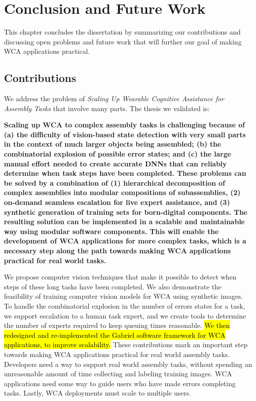 \chapter{Conclusion and Future Work}\label{chap:conclusion}

This chapter concludes the dissertation by summarizing our contributions and
discussing open problems and future work that will further our goal of making
WCA applications practical.

\section{Contributions}

We address the problem of \textit{Scaling Up Wearable Cognitive Assistance for
  Assembly Tasks} that involve many parts.
The thesis we validated is:

\textbf{
  Scaling up WCA to complex assembly tasks is challenging because of
  (a) the difficulty of
  vision-based state detection with very small parts in the context of much
  larger objects being assembled; (b) the combinatorial explosion
  of possible error states; and (c) the large manual effort needed to create
  accurate DNNs that can reliably determine when task steps have been completed.
  These problems can be solved by a combination of (1) hierarchical
  decomposition of
  complex assemblies into modular compositions of subassemblies, (2) on-demand
  seamless
  escalation for live expert assistance, and (3) synthetic generation of
  training
  sets for born-digital components. The resulting solution can be implemented in
  a scalable and maintainable way using modular software components.
  This will enable the development of WCA applications for more complex tasks,
  which is a necessary step along the path towards making WCA applications
  practical for real world tasks.
}

We propose computer vision techniques that make it possible to detect when steps
of these long tasks have been completed.
We also demonstrate the feasibility of training computer vision models for WCA
using synthetic images.
To handle the combinatorial explosion in the number of errors states for a task,
we support escalation to a human task expert, and we create tools to determine
the number of experts required to keep queuing times reasonable.
\hl{
  We then redesigned and re-implemented the Gabriel software framework for WCA
  applications, to improve scalability.
}
These contributions mark an important step towards making WCA applications
practical for real world assembly tasks.
Developers need a way to support real world assembly tasks, without spending an
unreasonable amount of time collecting and labeling training images.
WCA applications need some way to guide users who have made errors completing
tasks.
Lastly, WCA deployments must scale to multiple users.

